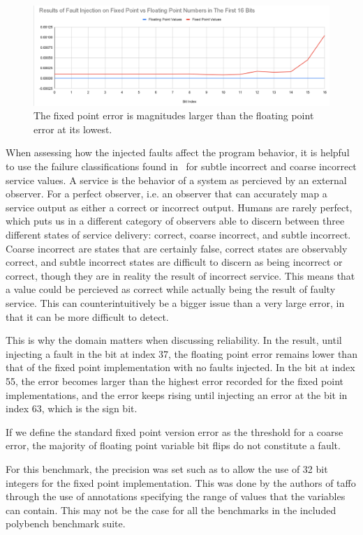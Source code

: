 \begin{figure}[h!]
    \centering
    \includegraphics[width=0.5\linewidth]{graph_fault_injection_fix_vs_float_first_16_bits.png}
    \caption{The fixed point error is magnitudes larger than the floating point error at its lowest.}
    \label{fig:graph_fixed_vs_float_error_first_16}
\end{figure}

When assessing how the injected faults affect the program behavior, it is helpful to use the failure classifications found in~\citet{failure_class_with_respect_to_detection} for subtle incorrect and coarse incorrect service values. A service is the behavior of a system as percieved by an external observer. For a perfect observer, i.e. an observer that can accurately map a service output as either a correct or incorrect output. Humans are rarely perfect, which puts us in a different category of observers able to discern between three different states of service delivery: correct, coarse incorrect, and subtle incorrect.  Coarse incorrect are states that are certainly false, correct states are observably correct, and subtle incorrect states are difficult to discern as being incorrect or correct, though they are in reality the result of incorrect service. This means that a value could be percieved as correct while actually being the result of faulty service. This can counterintuitively be a bigger issue than a very large error, in that it can be more difficult to detect.

This is why the domain matters when discussing reliability. In the result, until injecting a fault in the bit at index 37, the floating point error remains lower than that of the fixed point implementation with no faults injected. In the bit at index 55, the error becomes larger than the highest error recorded for the fixed point implementations, and the error keeps rising until injecting an error at the bit in index 63, which is the sign bit.

If we define the standard fixed point version error as the threshold for a coarse error, the majority of floating point variable bit flips do not constitute a fault. 

For this benchmark, the precision was set such as to allow the use of 32 bit integers for the fixed point implementation. This was done by the authors of taffo through the use of annotations specifying the range of values that the variables can contain. This may not be the case for all the benchmarks in the included polybench benchmark suite.

